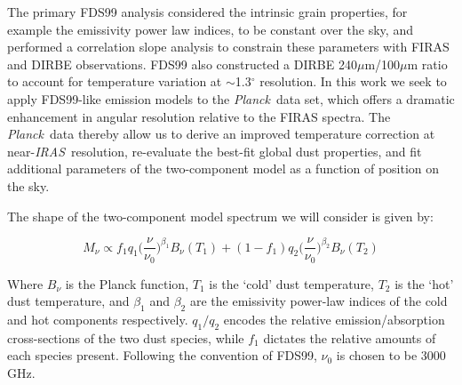 \documentclass{emulateapj}
\newcommand{\IRAS}{{\it IRAS}}
\newcommand{\PLANCK}{{\it Planck}}
\begin{document}
The primary FDS99 analysis considered the intrinsic grain properties, for 
example the emissivity power law indices, to be constant over the sky, and 
performed a correlation slope analysis to constrain these parameters with FIRAS
and DIRBE observations. FDS99 also constructed a DIRBE 240$\mu$m/100$\mu$m 
ratio to account for temperature variation at $\sim$1.3$^{\circ}$ resolution. 
In this work we seek to apply FDS99-like emission models to the \PLANCK~data 
set, which offers a dramatic enhancement in angular resolution relative to the 
FIRAS spectra. The \PLANCK~data thereby allow us to derive an improved 
temperature correction at near-\IRAS~resolution, re-evaluate the best-fit 
global dust properties, and fit additional parameters of the two-component 
model as a function of position on the sky. %





The shape of the two-component model spectrum we will consider is given by:

\begin{equation}
M_{\nu} \propto f_{1}q_{1}\Big(\frac{\nu}{\nu_{0}}\Big)^{\beta_1}B_{\nu}(T_1) + (1-f_{1})q_{2}\Big(\frac{\nu}{\nu_0}\Big)^{\beta_2}B_{\nu}(T_2)
\end{equation}

 


Where $B_{\nu}$ is the Planck function, $T_1$ is the `cold' dust temperature, 
$T_2$ is the `hot' dust temperature, and $\beta_1$ and $\beta_2$ are the
emissivity power-law indices of the cold and hot components respectively. 
$q_1/q_2$ encodes the relative emission/absorption cross-sections of the two 
dust species, while $f_1$ dictates the relative amounts of each species 
present. Following the convention of FDS99, $\nu_0$ is chosen to be 3000 GHz. 
\end{document}
